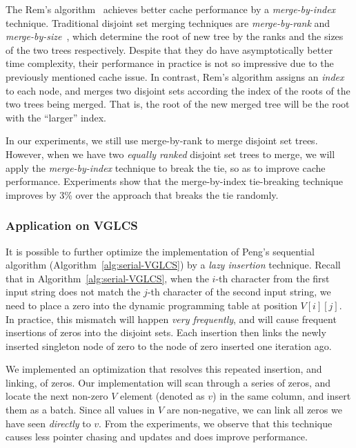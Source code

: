 
The Rem's algorithm~\cite{dijkstra1976a} achieves better cache
performance by a {\em merge-by-index} technique.  Traditional disjoint
set merging techniques are {\em merge-by-rank} and {\em
merge-by-size}~\cite{Tarjan1975EfficiencyOA}, which determine the root
of new tree by the ranks and the sizes of the two trees respectively.
Despite that they do have asymptotically better time complexity, their
performance in practice is not so impressive due to the previously
mentioned cache issue.  In contrast, Rem's algorithm assigns an {\em
index} to each node, and merges two disjoint sets according the index of
the roots of the two trees being merged.  That is, the root of the new
merged tree will be the root with the ``larger'' index.

In our experiments, we still use merge-by-rank to merge disjoint set
trees.  However, when we have two {\em equally ranked} disjoint set
trees to merge, we will apply the {\em merge-by-index} technique to
break the tie, so as to improve cache performance.  Experiments show
that the merge-by-index tie-breaking technique improves by 3\% over the
approach that breaks the tie randomly.

\subsubsection{Application on VGLCS}


It is possible to further optimize the implementation of Peng's
sequential algorithm (Algorithm~\ref{alg:serial-VGLCS}) by a {\em lazy
insertion} technique.  Recall that in Algorithm~\ref{alg:serial-VGLCS},
when the $i$-th character from the first input string does not match the
$j$-th character of the second input string, we need to place a zero
into the dynamic programming table at position $V[i][j]$.  In practice,
this mismatch will happen {\em very frequently}, and will cause frequent
insertions of zeros into the disjoint sets.  Each insertion then links
the newly inserted singleton node of zero to the node of zero inserted
one iteration ago.

We implemented an optimization that resolves this repeated insertion,
and linking, of zeros.  Our implementation will scan through a series of
zeros, and locate the next non-zero $V$ element (denoted as $v$) in the
same column, and insert them as a batch.  Since all values in $V$ are
non-negative, we can link all zeros we have seen {\em directly} to $v$.
From the experiments, we observe that this technique causes less pointer
chasing and updates and does improve performance.

